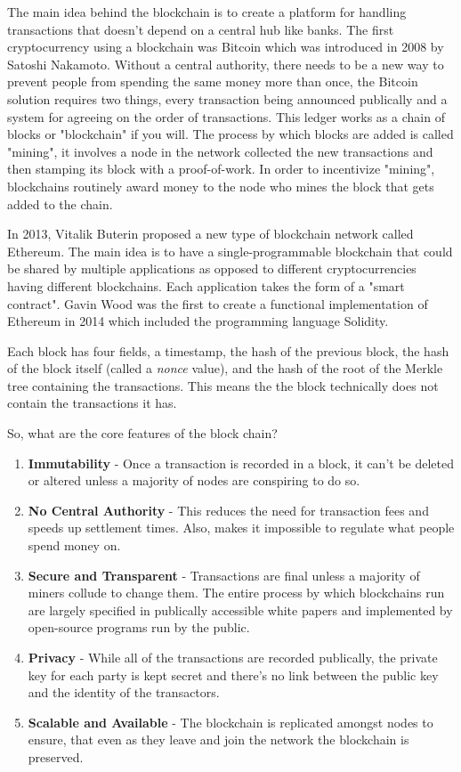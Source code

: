 \documentclass{article}
\begin{document}
The main idea behind the blockchain is to create a platform for handling transactions that doesn't depend on a central hub like banks. The first cryptocurrency using a blockchain was Bitcoin which was introduced in 2008 by Satoshi Nakamoto. Without a central authority, there needs to be a new way to prevent people from spending the same money more than once, the Bitcoin solution requires two things, every transaction being announced publically and a system for agreeing on the order of transactions. This ledger works as a chain of blocks or "blockchain" if you will. The process by which blocks are added is called "mining", it involves a node in the network collected the new transactions and then stamping its block with a proof-of-work. In order to incentivize "mining", blockchains routinely award money to the node who mines the block that gets added to the chain.

In 2013, Vitalik Buterin proposed a new type of blockchain network called Ethereum. The main idea is to have a single-programmable blockchain that could be shared by multiple applications as opposed to different cryptocurrencies having different blockchains. Each application takes the form of a "smart contract". Gavin Wood was the first to create a functional implementation of Ethereum in 2014 which included the programming language Solidity.

Each block has four fields, a timestamp, the hash of the previous block, the hash of the block itself (called a \textit{nonce} value), and the hash of the root of the Merkle tree containing the transactions. This means the the block technically does not contain the transactions it has.

So, what are the core features of the block chain?
\begin{enumerate}
\item \textbf{Immutability} - Once a transaction is recorded in a block, it can't be deleted or altered unless a majority of nodes are conspiring to do so.
\item \textbf{No Central Authority} - This reduces the need for transaction fees and speeds up settlement times. Also, makes it impossible to regulate what people spend money on.
\item \textbf{Secure and Transparent} - Transactions are final unless a majority of miners collude to change them. The entire process by which blockchains run are largely specified in publically accessible white papers and implemented by open-source programs run by the public.
\item \textbf{Privacy} - While all of the transactions are recorded publically, the private key for each party is kept secret and there's no link between the public key and the identity of the transactors.
\item \textbf{Scalable and Available} - The blockchain is replicated amongst nodes to ensure, that even as they leave and join the network the blockchain is preserved.
\end{enumerate}
\end{document}
